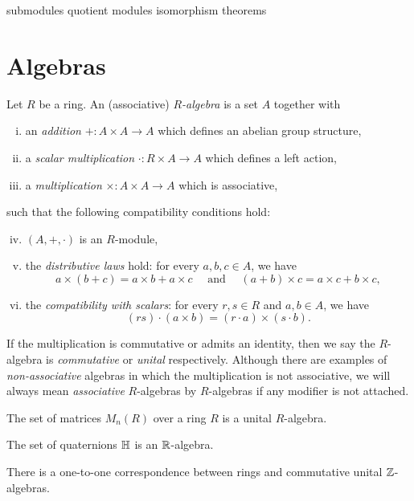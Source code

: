 \documentclass{../../large}
\begin{document}
submodules
quotient modules
isomorphism theorems


\section{Algebras}
\begin{prb}
Let $R$ be a ring.
An (associative) \emph{$R$-algebra} is a set $A$ together with
\begin{enumerate}[(i)]
\item an \emph{addition} $+:A\times A\to A$ which defines an abelian group structure,
\item a \emph{scalar multiplication} $\cdot:R\times A\to A$ which defines a left action,
\item a \emph{multiplication} $\times:A\times A\to A$ which is associative,
\end{enumerate}
such that the following compatibility conditions hold:
\begin{enumerate}[(i)]\setcounter{enumi}{3}
\item $(A,+,\cdot)$ is an $R$-module,
\item the \emph{distributive laws} hold: for every $a,b,c\in A$, we have
\[a\times(b+c)=a\times b+a\times c\quad\text{ and }\quad(a+b)\times c=a\times c+b\times c,\]
\item the \emph{compatibility with scalars}: for every $r,s\in R$ and $a,b\in A$, we have
\[(rs)\cdot(a\times b)=(r\cdot a)\times(s\cdot b).\]
\end{enumerate}
If the multiplication is commutative or admits an identity, then we say the $R$-algebra is \emph{commutative} or \emph{unital} respectively.
Although there are examples of \emph{non-associative} algebras in which the multiplication is not associative, we will always mean \emph{associative} $R$-algebras by $R$-algebras if any modifier is not attached.
\begin{parts}
\item The set of matrices $M_n(R)$ over a ring $R$ is a unital $R$-algebra.
\item The set of quaternions $\mathbb{H}$ is an $\mathbb{R}$-algebra.
\item There is a one-to-one correspondence between rings and commutative unital $\mathbb{Z}$-algebras.
\end{parts}
\end{prb}
\end{document}
